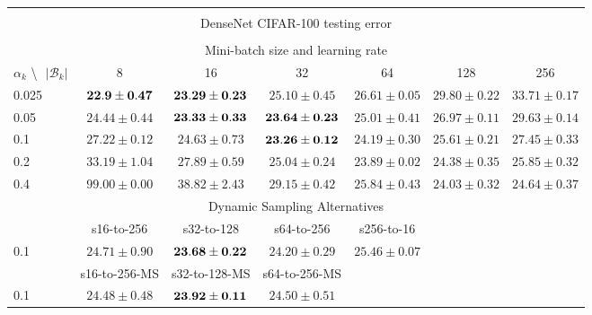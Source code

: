\documentclass[10pt,journal,compsoc]{IEEEtran}
\begin{document}
\begin{table*}[!htbp]
\begin{center}
{\begin{tabular}{|l|c|c|c|c|c|c|}
\multicolumn{7}{|c|}{} \\
\multicolumn{7}{|c|}{DenseNet CIFAR-100 testing error} \\
\multicolumn{7}{|c|}{} \\
\hline
\multicolumn{7}{|c|}{Mini-batch size and learning rate} \\
\hline
$\alpha_k$ \textbackslash $ \text{   } {|\mathcal{B}_k|}$ & 8 & 16 & 32 & 64 & 128 & 256\\
\hline
0.025 &  $\bf 22.9\pm0.47$ & $\bf 23.29\pm0.23$ & $25.10\pm0.45$ & $26.61\pm0.05$ & $29.80\pm0.22$ & $33.71\pm0.17$  \\
\hline
0.05  & $24.44\pm0.44$ & $\bf 23.33\pm0.33$ & $\bf 23.64\pm0.23$ & $25.01\pm0.41$ & $26.97\pm0.11$ & $29.63\pm0.14$ \\
\hline
0.1   & $27.22\pm0.12$ & $24.63\pm0.73$ & $\bf 23.26\pm0.12$ & $24.19\pm0.30$ & $25.61\pm0.21$ & $27.45\pm0.33$  \\
\hline
0.2   & $33.19\pm1.04$ & $27.89\pm0.59$ & $25.04\pm0.24$ & $23.89\pm0.02$ & $24.38\pm0.35$ & $25.85\pm0.32$  \\
\hline
0.4   & $99.00\pm0.00$ & $38.82\pm2.43$ & $29.15\pm0.42$ & $25.84\pm0.43$ & $24.03\pm0.32$ & $24.64\pm0.37$  \\
\hline
\multicolumn{7}{|c|}{Dynamic Sampling Alternatives}\\
\hline
& s16-to-256  & s32-to-128 & s64-to-256 & s256-to-16 & & \\
\hline
0.1   & $24.71\pm0.90$ & $\bf 23.68\pm0.22$ & $24.20\pm0.29$ & $25.46\pm0.07$ & & \\
\hline
& s16-to-256-MS & s32-to-128-MS & s64-to-256-MS & 
& & \\
\hline
0.1 & $24.48\pm0.48$ & $\bf 23.92\pm0.11$ & $24.50\pm0.51$ & 
& & \\
\hline
\end{tabular}}
\end{center}
\end{table*}
\end{document}
